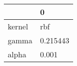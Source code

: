 \begin{tabular}{ll}
\toprule
{} &         0 \\
\midrule
kernel &       rbf \\
gamma  &  0.215443 \\
alpha  &     0.001 \\
\bottomrule
\end{tabular}
